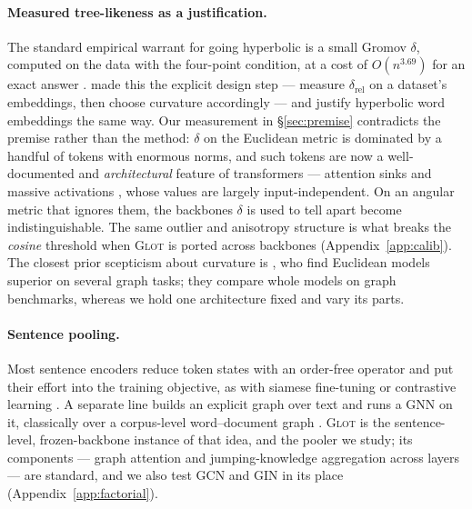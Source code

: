 \documentclass{article}
\begin{document}
\paragraph{Measured tree-likeness as a justification.} The standard empirical
warrant for going hyperbolic is a small Gromov $\delta$, computed on the data
with the four-point condition, at a cost of $O(n^{3.69})$ for an exact answer
\citep{fournier2015gromov}. \citet{khrulkov2020hyperbolicimage} made this the
explicit design step --- measure $\delta_{\text{rel}}$ on a dataset's
embeddings, then choose curvature accordingly --- and
\citet{tifrea2018poincareglove} justify hyperbolic word embeddings the same
way. Our measurement in \S\ref{sec:premise} contradicts the premise rather than
the method: $\delta$ on the Euclidean metric is dominated by a handful of tokens
with enormous norms, and such tokens are now a well-documented and
\emph{architectural} feature of transformers --- attention sinks
\citep{xiao2024attentionsinks} and massive activations
\citep{sun2024massiveactivations}, whose values are largely input-independent.
On an angular metric that ignores them, the backbones $\delta$ is used to tell
apart become indistinguishable. The same outlier and anisotropy structure
\citep{ethayarajh2019contextual,gao2019degeneration} is what breaks the
\emph{cosine} threshold when \textsc{Glot} is ported across backbones
(Appendix~\ref{app:calib}). The closest prior scepticism about curvature is
\citet{kochurov2020createdequal}, who find Euclidean models superior on several
graph tasks; they compare whole models on graph benchmarks, whereas we hold one
architecture fixed and vary its parts.

\paragraph{Sentence pooling.} Most sentence encoders reduce token states with an
order-free operator and put their effort into the training objective, as with
siamese fine-tuning \citep{reimers2019sbert} or contrastive learning
\citep{gao2021simcse}. A separate line builds an explicit graph over text and
runs a GNN on it, classically over a corpus-level word--document graph
\citep{yao2019textgcn}. \textsc{Glot} \citep{mantri2026glot} is the
sentence-level, frozen-backbone instance of that idea, and the pooler we study;
its components --- graph attention \citep{velickovic2018gat} and
jumping-knowledge aggregation across layers \citep{xu2018jk} --- are standard,
and we also test GCN \citep{kipf2017gcn} and GIN \citep{xu2019gin} in its place
(Appendix~\ref{app:factorial}).
\end{document}
